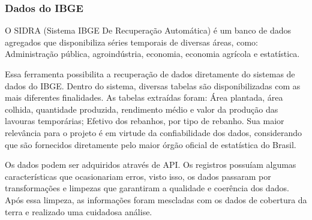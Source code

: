 \subsubsection{Dados do IBGE}


O SIDRA (Sistema IBGE De Recuperação Automática) é um banco de dados agregados que disponibiliza séries temporais de diversas áreas, como: Administração pública, agroindústria, economia, economia agrícola e estatística.

Essa ferramenta possibilita a recuperação de dados diretamente do sistemas de dados do IBGE. Dentro do sistema, diversas tabelas são disponibilizadas com as mais diferentes finalidades. As tabelas extraídas foram: Área plantada, área colhida, quantidade produzida, rendimento médio e valor da produção das lavouras temporárias; Efetivo dos rebanhos, por tipo de rebanho. Sua maior relevância para o projeto é em virtude da confiabilidade dos dados, considerando que são fornecidos diretamente pelo maior órgão oficial de estatística do Brasil.

Os dados podem ser adquiridos através de API. Os registros possuíam algumas características que ocasionariam erros, visto isso, os dados passaram por transformações e limpezas que garantiram a qualidade e coerência dos dados. Após essa limpeza, as informações foram mescladas com os dados de cobertura da terra e realizado uma cuidadosa análise. 

